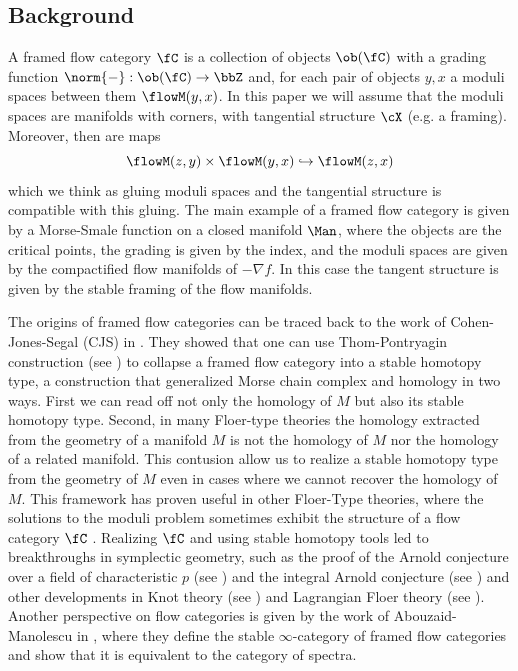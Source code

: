 \subsection*{Background}
A framed flow category $\fC$ is a collection of objects $\ob(\fC)$ with a grading function $\norm{-} : \ob(\fC) \to \bbZ$ and, for each pair of objects $y,x$ a moduli spaces between them $\flowM(y,x)$. In this paper we will assume that the moduli spaces are manifolds with corners, with tangential structure $\cX$ (e.g. a framing). Moreover, then are maps 
\[
    \flowM(z,y) \times \flowM(y,x) \hookrightarrow \flowM(z,x)
\]
which we think as gluing moduli spaces and the tangential structure is compatible with this gluing. The main example of a framed flow category is given by a Morse-Smale function on a closed manifold $\Man$, where the objects are the critical points, the grading is given by the index, and the moduli spaces are given by the compactified flow manifolds of $-\nabla f$. In this case the tangent structure is given by the stable framing of the flow manifolds.

The origins of framed flow categories can be traced back to the work of Cohen-Jones-Segal (CJS) in \cite{CJS95}. They showed that one can use Thom-Pontryagin construction (see \cite{thom1954quelques,pontryagin1955smooth}) to collapse a framed flow category into a stable homotopy type, a construction that generalized Morse chain complex and homology in two ways. First we can read off not only the homology of $M$ but also its stable homotopy type. Second, in many Floer-type theories the homology extracted from the geometry of a manifold $M$ is not the homology of $M$ nor the homology of a related manifold. This contusion allow us to realize a stable homotopy type from the geometry of $M$ even in cases where we cannot recover the homology of $M$.
 This framework has proven useful in other Floer-Type theories, where the solutions to the moduli problem sometimes exhibit the structure of a flow category $\fC$ \cite{chanda2025contact, }. Realizing $\fC$ and using stable homotopy tools led to breakthroughs in symplectic geometry, such as the proof of the Arnold conjecture over a field of characteristic $p$ (see \cite{abouzaid2021arnold}) and the integral Arnold conjecture (see \cite{rezchikov2022integral, bai2022arnold}) and other developments in Knot theory (see \cite{lipshitz2014steenrod}) and Lagrangian Floer theory (see \cite{abouzaid2018simple,porcelli2024bordism, porcelli2024spectral}).
 Another perspective on flow categories is given by the work of Abouzaid-Manolescu in \cite{abouzaid2024foundation}, where they define the stable $\infty$-category of framed flow categories and show that it is equivalent to the category of spectra.

